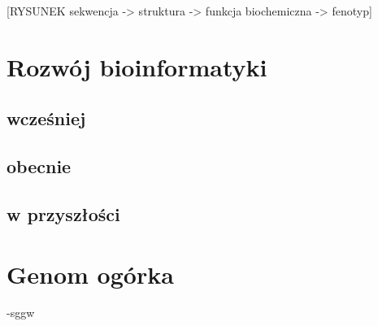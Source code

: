 [RYSUNEK sekwencja -> struktura -> funkcja biochemiczna -> fenotyp]


\section{Rozwój bioinformatyki}
\subsection{wcześniej}
\subsection{obecnie}
\subsection{w przyszłości}

\section{Genom ogórka}
-sggw

